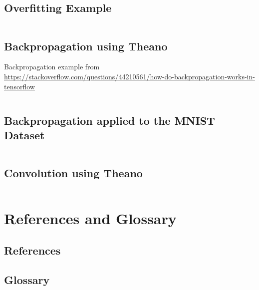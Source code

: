 \documentclass[a4paper,twoside,10pt]{article}
\begin{document}
\subsection{Overfitting Example}\label{app:overfitting}
\inputminted[frame=lines,linenos,fontsize=\small]{python}{overfitting.py}

\subsection{Backpropagation using Theano}\label{app:backprop}
Backpropagation example from \url{https://stackoverflow.com/questions/44210561/how-do-backpropagation-works-in-tensorflow}
\inputminted[frame=lines,linenos,fontsize=\small]{python}{backprop.py}

\subsection{Backpropagation applied to the MNIST Dataset}\label{app:mnistbackprop}
\inputminted[frame=lines,linenos,fontsize=\small]{python}{mnist-backprop.py}

\subsection{Convolution using Theano}
\inputminted[frame=lines,linenos,fontsize=\small]{python}{convolution.py}

\section{References and Glossary}
\subsection{References}
\printbibliography[heading=none]

\subsection{Glossary}
\begin{acronym}[L-BFGS]
\end{acronym}
\end{document}
